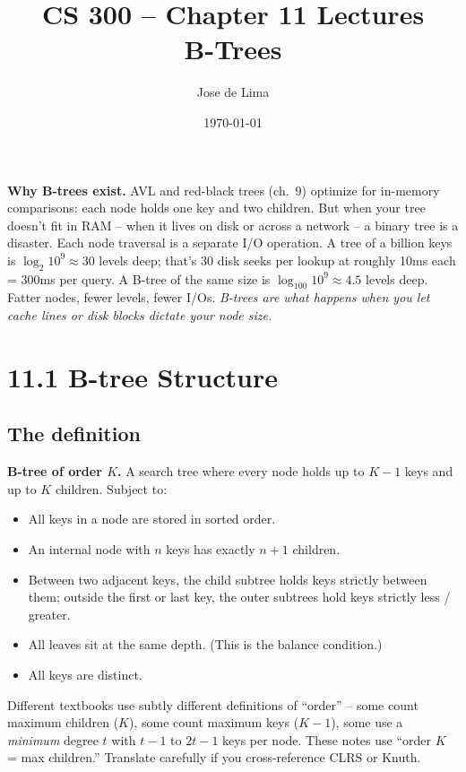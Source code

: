 \documentclass[11pt]{article}
\title{CS 300 -- Chapter 11 Lectures\\\large B-Trees}
\author{Jose de Lima}
\date{\today}
\begin{document}
\maketitle

\begin{ideabox}
\textbf{Why B-trees exist.} AVL and red-black trees (ch.\ 9) optimize for in-memory comparisons: each node holds one key and two children. But when your tree doesn't fit in RAM -- when it lives on disk or across a network -- a binary tree is a disaster. Each node traversal is a separate I/O operation. A tree of a billion keys is $\log_2 10^9 \approx 30$ levels deep; that's 30 disk seeks per lookup at roughly 10ms each = 300ms per query. A B-tree of the same size is $\log_{100} 10^9 \approx 4.5$ levels deep. Fatter nodes, fewer levels, fewer I/Os. \emph{B-trees are what happens when you let cache lines or disk blocks dictate your node size.}
\end{ideabox}

\section{11.1 B-tree Structure}

\subsection*{The definition}

\begin{defnbox}
\textbf{B-tree of order $K$.} A search tree where every node holds up to $K-1$ keys and up to $K$ children. Subject to:
\begin{itemize}[leftmargin=*]
    \item All keys in a node are stored in sorted order.
    \item An internal node with $n$ keys has exactly $n+1$ children.
    \item Between two adjacent keys, the child subtree holds keys strictly between them; outside the first or last key, the outer subtrees hold keys strictly less / greater.
    \item All leaves sit at the same depth. (This is the balance condition.)
    \item All keys are distinct.
\end{itemize}
\end{defnbox}

\begin{notebox}
Different textbooks use subtly different definitions of ``order'' -- some count maximum children ($K$), some count maximum keys ($K-1$), some use a \emph{minimum} degree $t$ with $t-1$ to $2t-1$ keys per node. These notes use ``order $K$ = max children.'' Translate carefully if you cross-reference CLRS or Knuth.
\end{notebox}
\end{document}
